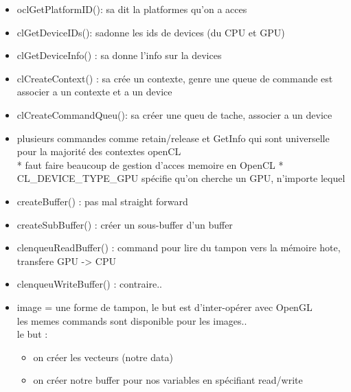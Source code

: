 \documentclass[oneside]{book}
\begin{document}
\begin{itemize}
\item oclGetPlatformID(): sa dit la platformes qu'on a acces

\item clGetDeviceIDs(): sadonne les ids de devices (du CPU et GPU)

\item clGetDeviceInfo() : sa donne l'info sur la devices

\item clCreateContext() : sa crée un contexte, genre une queue de commande est associer a un contexte et a un device

\item clCreateCommandQueu(): sa créer une queu de tache, associer a un device

\item plusieurs commandes comme retain/release et GetInfo qui sont universelle pour la majorité des contextes openCL\\

* faut faire beaucoup de gestion d'acces memoire en OpenCL *\\

CL\_DEVICE\_TYPE\_GPU spécifie qu'on cherche un GPU, n'importe lequel\\

\item createBuffer() : pas mal straight forward

\item createSubBuffer() : créer un sous-buffer d'un buffer

\item clenqueuReadBuffer() : command pour lire du tampon vers la mémoire hote, transfere GPU -­> CPU
\item clenqueuWriteBuffer() : contraire..

\item image = une forme de tampon, le but est d'inter-opérer avec OpenGL\\

les memes commands sont disponible pour les images..\\

le but :\\
\begin{itemize}
\item on créer les vecteurs (notre data)
\item on créer notre buffer pour nos variables en spécifiant read/write
\end{itemize}
	

\end{itemize}
\end{document}
